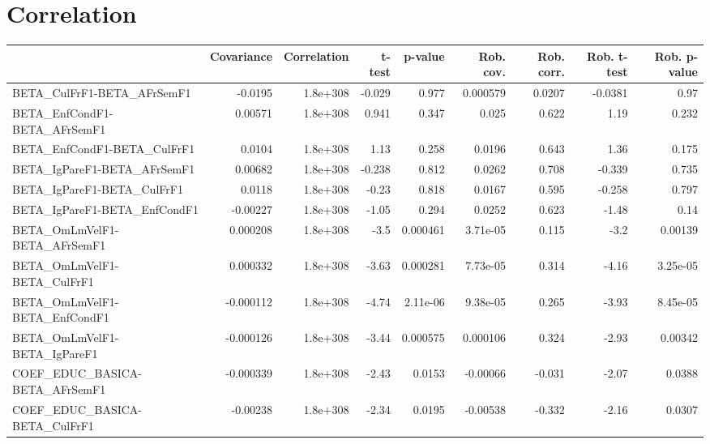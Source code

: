 \section{Correlation}
\begin{tabular}{lrrrrrrrr}
\toprule
{} &  Covariance &  Correlation &  t-test &  p-value &  Rob. cov. &  Rob. corr. &  Rob. t-test &  Rob. p-value \\
\midrule
BETA\_CulFrF1-BETA\_AFrSemF1            &     -0.0195 &     1.8e+308 &  -0.029 &    0.977 &   0.000579 &      0.0207 &      -0.0381 &          0.97 \\
BETA\_EnfCondF1-BETA\_AFrSemF1          &     0.00571 &     1.8e+308 &   0.941 &    0.347 &      0.025 &       0.622 &         1.19 &         0.232 \\
BETA\_EnfCondF1-BETA\_CulFrF1           &      0.0104 &     1.8e+308 &    1.13 &    0.258 &     0.0196 &       0.643 &         1.36 &         0.175 \\
BETA\_IgPareF1-BETA\_AFrSemF1           &     0.00682 &     1.8e+308 &  -0.238 &    0.812 &     0.0262 &       0.708 &       -0.339 &         0.735 \\
BETA\_IgPareF1-BETA\_CulFrF1            &      0.0118 &     1.8e+308 &   -0.23 &    0.818 &     0.0167 &       0.595 &       -0.258 &         0.797 \\
BETA\_IgPareF1-BETA\_EnfCondF1          &    -0.00227 &     1.8e+308 &   -1.05 &    0.294 &     0.0252 &       0.623 &        -1.48 &          0.14 \\
BETA\_OmLmVelF1-BETA\_AFrSemF1          &    0.000208 &     1.8e+308 &    -3.5 & 0.000461 &   3.71e-05 &       0.115 &         -3.2 &       0.00139 \\
BETA\_OmLmVelF1-BETA\_CulFrF1           &    0.000332 &     1.8e+308 &   -3.63 & 0.000281 &   7.73e-05 &       0.314 &        -4.16 &      3.25e-05 \\
BETA\_OmLmVelF1-BETA\_EnfCondF1         &   -0.000112 &     1.8e+308 &   -4.74 & 2.11e-06 &   9.38e-05 &       0.265 &        -3.93 &      8.45e-05 \\
BETA\_OmLmVelF1-BETA\_IgPareF1          &   -0.000126 &     1.8e+308 &   -3.44 & 0.000575 &   0.000106 &       0.324 &        -2.93 &       0.00342 \\
COEF\_EDUC\_BASICA-BETA\_AFrSemF1        &   -0.000339 &     1.8e+308 &   -2.43 &   0.0153 &   -0.00066 &      -0.031 &        -2.07 &        0.0388 \\
COEF\_EDUC\_BASICA-BETA\_CulFrF1         &    -0.00238 &     1.8e+308 &   -2.34 &   0.0195 &   -0.00538 &      -0.332 &        -2.16 &        0.0307 \\

\end{tabular}
